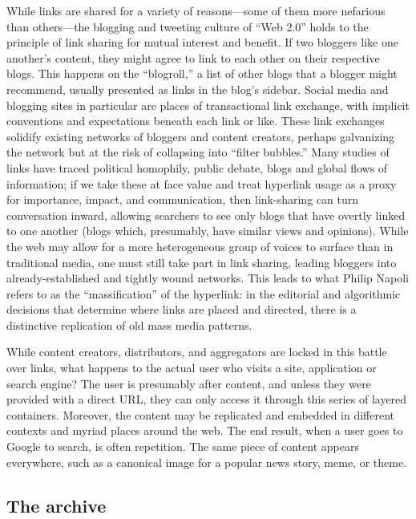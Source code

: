 While links are shared for a variety of reasons---some of them more nefarious than others---the blogging and tweeting culture of ``Web 2.0'' holds to the principle of link sharing for mutual interest and benefit. If two bloggers like one another's content, they might agree to link to each other on their respective blogs. This happens on the ``blogroll,'' a list of other blogs that a blogger might recommend, usually presented as links in the blog's sidebar. Social media and blogging sites in particular are places of transactional link exchange, with implicit conventions and expectations beneath each link or like. These link exchanges solidify existing networks of bloggers and content creators, perhaps galvanizing the network but at the risk of collapsing into ``filter bubbles.'' Many studies of links have traced political homophily, public debate, blogs and global flows of information; if we take these at face value and treat hyperlink usage as a proxy for importance, impact, and communication, then link-sharing can turn conversation inward, allowing searchers to see only blogs that have overtly linked to one another (blogs which, presumably, have similar views and opinions).\autocite[See][]{graells-garrido_data_2013} While the web may allow for a more heterogeneous group of voices to surface than in traditional media, one must still take part in link sharing, leading bloggers into already-established and tightly wound networks. This leads to what Philip Napoli refers to as the ``massification'' of the hyperlink: in the editorial and algorithmic decisions that determine where links are placed and directed, there is a distinctive replication of old mass media patterns.\autocite{tsui_hyperlinking_2008}

While content creators, distributors, and aggregators are locked in this battle over links, what happens to the actual user who visits a site, application or search engine? The user is presumably after content, and unless they were provided with a direct URL, they can only access it through this series of layered containers. Moreover, the content may be replicated and embedded in different contexts and myriad places around the web. The end result, when a user goes to Google to search, is often repetition. The same piece of content appears everywhere, such as a canonical image for a popular news story, meme, or theme.

\subsection{The archive}

